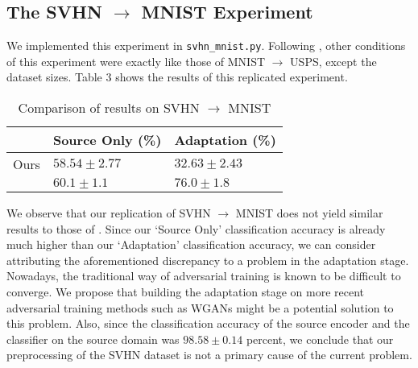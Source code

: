 \documentclass[14pt]{extarticle}
\begin{document}
		\subsection{The SVHN $\rightarrow$ MNIST Experiment}
		We implemented this experiment in \texttt{svhn\_mnist.py}. Following \cite{adda}, other conditions of this experiment were exactly like those of MNIST $\rightarrow$ USPS, except the dataset sizes. Table 3 shows the results of this replicated experiment.
		\begin{table}[H]
			\centering
			\begin{tabular}{|P{40mm}|P{40mm}|P{40mm}|}
				\hline
				 & Source Only (\%) & Adaptation (\%)\\
				\hline
				Ours & $58.54 \pm 2.77$ & $32.63 \pm 2.43$\\
				\hline
				\cite{adda} & $60.1 \pm 1.1$ & $76.0 \pm 1.8$\\
				\hline
			\end{tabular}
			\caption{Comparison of results on SVHN $\rightarrow$ MNIST}
		\end{table}
		We observe that our replication of SVHN $\rightarrow$ MNIST does not yield similar results to those of \cite{adda}. Since our `Source Only' classification accuracy is already much higher than our `Adaptation' classification accuracy, we can consider attributing the aforementioned discrepancy to a problem in the adaptation stage. Nowadays, the traditional way of adversarial training is known to be difficult to converge. We propose that building the adaptation stage on more recent adversarial training methods such as WGANs \cite{wgan} might be a potential solution to this problem. Also, since the classification accuracy of the source encoder and the classifier on the source domain was $98.58 \pm 0.14$ percent, we conclude that our preprocessing of the SVHN dataset is not a primary cause of the current problem.
\end{document}
